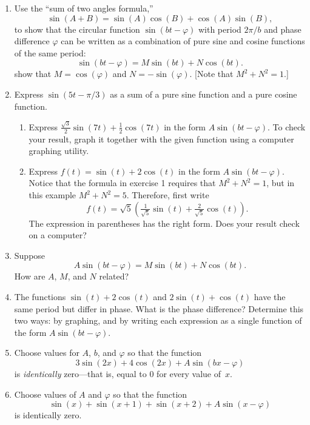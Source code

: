 \begin{enumerate}
\item Use the ``sum of two angles formula,''
	\[
\sin(A + B) = \sin(A) \cos(B) + \cos(A) \sin(B),
\]
to show that the circular function $\sin(bt - \varphi)$ with period
$2\pi/b$ and phase difference $\varphi$ can be written as a
combination of pure sine and cosine functions of the same period:
	\[
\sin(bt - \varphi) = M \sin(bt) + N \cos(bt).
\]
show that $M = \cos(\varphi)$ and $N = -\sin(\varphi)$.  [Note that
  $M^2 + N^2=1$.]


\item Express $\sin(5t - \pi/3)$ as a sum of a pure sine function and
a pure cosine function.

  \begin{enumerate}
  \item Express $\frac{\sqrt{3}}{2}\sin(7t) + \frac{1}{2}\cos(7t)$ in the
form $A\sin(bt - \varphi)$.  To check your result, graph it together
with the given function using a computer graphing utility.

  \item Express $f(t) = \sin(t) + 2\cos(t)$ in the form $A\sin(bt -
\varphi)$.  Notice that the formula in exercise 1 requires that $M^2 +
N^2 = 1$, but in this example $M^2 + N^2 = 5$.  Therefore, first write
	\[
f(t) = \sqrt{5} \left( \tfrac{1}{\sqrt{5}} \sin(t) + 
		\tfrac{2}{\sqrt{5}} \cos(t) \right).
\]
The expression in parentheses has the right form.  Does your result
check on a computer?


\end{enumerate}
\item Suppose
	\[
A \sin(bt - \varphi) = M \sin(bt) + N \cos(bt).
\]
How are $A$, $M$, and $N$ related?


\item The functions $\sin(t) + 2 \cos(t)$ and $2\sin(t) + \cos(t)$ have
the same period but differ in phase.  What is the phase difference?
Determine this two ways: by graphing, and by writing each expression
as a single function of the form $A \sin(bt - \varphi)$.


\item Choose values for $A$, $b$, and $\varphi$ so that the function
	\[
3 \sin(2x) + 4 \cos(2x) + A \sin(bx - \varphi)
\]
is {\em identically\/} zero---that is, equal to 0 for every value of~$x$.


\item Choose values of $A$ and $\varphi$ so that the function
	\[
\sin(x) + \sin(x + 1) + \sin(x + 2) + A\sin(x - \varphi)
\]
is identically zero.


\end{enumerate}
